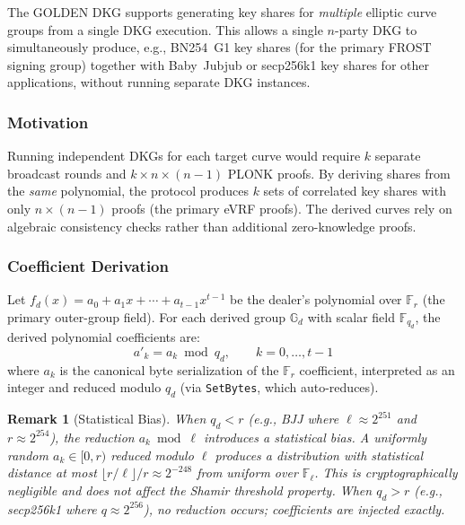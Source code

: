 \documentclass[11pt,a4paper]{article}
\newtheorem{remark}{Remark}[section]
\newcommand{\F}{\mathbb{F}}
\newcommand{\G}{\mathbb{G}}
\newcommand{\Fr}{\F_r}
\begin{document}
The GOLDEN DKG supports generating key shares for \emph{multiple} elliptic
curve groups from a single DKG execution. This allows a single $n$-party DKG
to simultaneously produce, e.g., BN254~G1 key shares (for the primary FROST
signing group) together with Baby~Jubjub or secp256k1 key shares for other
applications, without running separate DKG instances.

\subsubsection{Motivation}

Running independent DKGs for each target curve would require $k$ separate
broadcast rounds and $k \times n \times (n-1)$ PLONK proofs. By deriving
shares from the \emph{same} polynomial, the protocol produces $k$ sets of
correlated key shares with only $n \times (n-1)$ proofs (the primary eVRF
proofs). The derived curves rely on algebraic consistency checks rather than
additional zero-knowledge proofs.

\subsubsection{Coefficient Derivation}

Let $f_d(x) = a_0 + a_1 x + \cdots + a_{t-1} x^{t-1}$ be the dealer's
polynomial over $\Fr$ (the primary outer-group field). For each derived group
$\G_d$ with scalar field $\F_{q_d}$, the derived polynomial coefficients are:
\begin{equation}
  a'_k = a_k \bmod q_d, \qquad k = 0, \ldots, t-1
  \label{eq:derived-coeff}
\end{equation}
where $a_k$ is the canonical byte serialization of the $\Fr$ coefficient,
interpreted as an integer and reduced modulo $q_d$ (via \texttt{SetBytes},
which auto-reduces).

\begin{remark}[Statistical Bias]
  When $q_d < r$ (e.g., BJJ where $\ell \approx 2^{251}$ and $r \approx 2^{254}$),
  the reduction $a_k \bmod \ell$ introduces a statistical bias. A uniformly
  random $a_k \in [0, r)$ reduced modulo $\ell$ produces a distribution with
  statistical distance at most $\lfloor r / \ell \rfloor / r \approx 2^{-248}$
  from uniform over $\F_\ell$. This is cryptographically negligible and does
  not affect the Shamir threshold property. When $q_d > r$ (e.g., secp256k1
  where $q \approx 2^{256}$), no reduction occurs; coefficients are injected
  exactly.
\end{remark}
\end{document}
